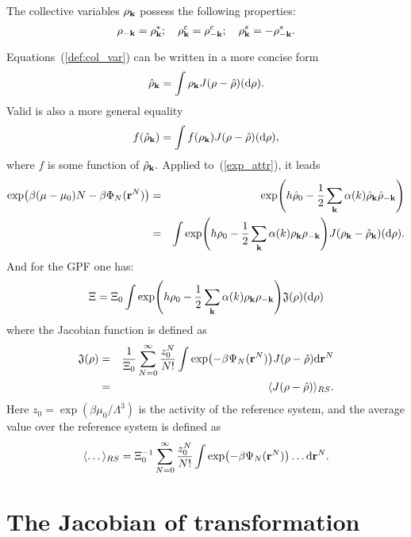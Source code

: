 The collective variables $\rho_{\vb k}$ possess the following properties:
\begin{equation}
	\rho_{-\vb k} = \rho_{\vb k}^*; \quad \rho_{\vb k}^c = \rho_{-\vb k}^c; \quad \rho_{\vb k}^s = -\rho_{-\vb k}^s.
\end{equation}

Equations~(\ref{def:col_var}) can be written in a more concise form
\begin{equation}
	\hat{\rho}_{\vb k} = \int\rho_{\vb k} J(\rho - \hat{\rho}) ({\rm d}\rho).
\end{equation}
Valid is also a more general equality
\begin{equation}
	f(\hat{\rho}_{\vb k}) = \int f(\rho_{\vb k}) J(\rho - \hat{\rho}) ({\rm d}\rho),
\end{equation}
where $f$ is some function of $\hat{\rho}_{\vb k}.$ Applied to~(\ref{exp_attr}), it leads
\begin{eqnarray}
	\label{exp_attr2}
	\exp(\beta(\mu - \mu_0)N - \beta\Phi_N(\vb r^N)) &=& \exp(h\hat{\rho}_0 - \frac{1}{2} \sum_{\vb k} \alpha(k) \hat{\rho}_{\vb k} \hat{\rho}_{-\vb k} )
	\nonumber\\
	&=& \int \exp(h\rho_0 - \frac{1}{2} \sum_{\vb k} \alpha(k) \rho_{\vb k} \rho_{-\vb k}) J(\rho_{\vb k} - \hat{\rho}_{\vb k}) ({\rm d} \rho).
\end{eqnarray}
And for the GPF one has:
\begin{equation}
	\Xi = \Xi_0 \int \exp(h\rho_0 - \frac12\sum_{\vb k}\alpha(k) \rho_{\vb k} \rho_{-\vb k}) \mathfrak{J}(\rho) ({\rm d} \rho)
\end{equation}
where the Jacobian function is defined as
\begin{eqnarray}
	\label{def:jacobian}
	\mathfrak{J}(\rho) &=& \frac{1}{\Xi_0}\sum_{N=0}^{\infty} \frac{z_0^N}{N!}\int \exp(-\beta\Psi_N(\vb r^N)) J(\rho - \hat{\rho}) {\rm d}{\vb r^N}
	\nonumber\\
	&=& \langle J(\rho - \hat{\rho}) \rangle_{RS}.
\end{eqnarray}
Here $z_0=\exp(\beta\mu_0/\Lambda^3)$ is the activity of the reference system, and the average value over the reference system is defined as
\begin{equation}
	\label{def:average_rs}
	\langle \dotsc \rangle_{RS} = \Xi_0^{-1} \sum_{N=0}^{\infty} \frac{z_0^N}{N!} \int \exp(-\beta\Psi_N(\vb r^N)) \dotsc {\rm d} {\vb r}^N.
\end{equation}

\section{\label{sec:jacobian} The Jacobian of transformation}

